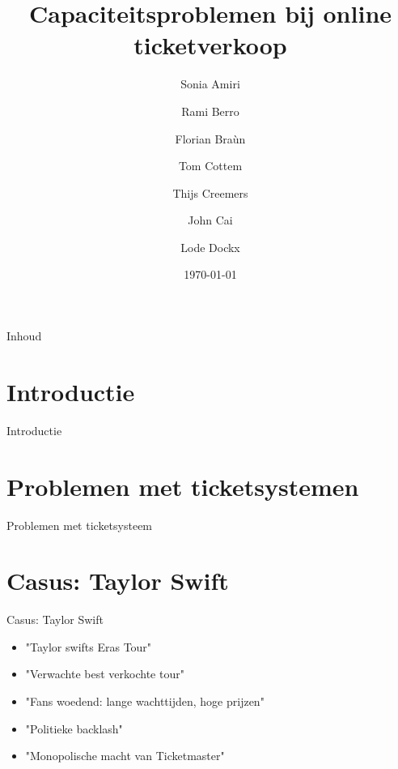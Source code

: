 \documentclass{beamer}
\title{Capaciteitsproblemen bij online ticketverkoop}
\author{Sonia Amiri \and Rami Berro \and Florian Braùn \and Tom Cottem \and Thijs Creemers \and John Cai \and Lode Dockx}
\date{\today}
\begin{document}
\begin{frame}
  \titlepage
\end{frame}

\begin{frame}{Inhoud}
  \tableofcontents
\end{frame}

\section{Introductie}
\begin{frame}{Introductie}

\end{frame}
\section{Problemen met ticketsystemen}
\begin{frame}{Problemen met ticketsysteem}
    
\end{frame}
\section{Casus: Taylor Swift} %
\begin{frame}{Casus: Taylor Swift}
    \begin{itemize}
        \item "Taylor swifts Eras Tour"
        \item "Verwachte best verkochte tour"
        \item "Fans woedend: lange wachttijden, hoge prijzen"
        \item "Politieke backlash"
        \item "Monopolische macht van Ticketmaster"
    \end{itemize}
\end{frame}
    
    
\end{document}
